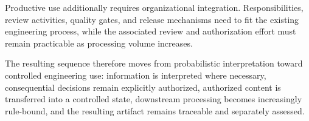 Productive use additionally requires organizational integration. Responsibilities, review
activities, quality gates, and release mechanisms need to fit the existing engineering
process, while the associated review and authorization effort must remain practicable as
processing volume increases.

The resulting sequence therefore moves from probabilistic interpretation toward controlled
engineering use: information is interpreted where necessary, consequential decisions remain
explicitly authorized, authorized content is transferred into a controlled state,
downstream processing becomes increasingly rule-bound, and the resulting artifact remains
traceable and separately assessed.

\FloatBarrier
